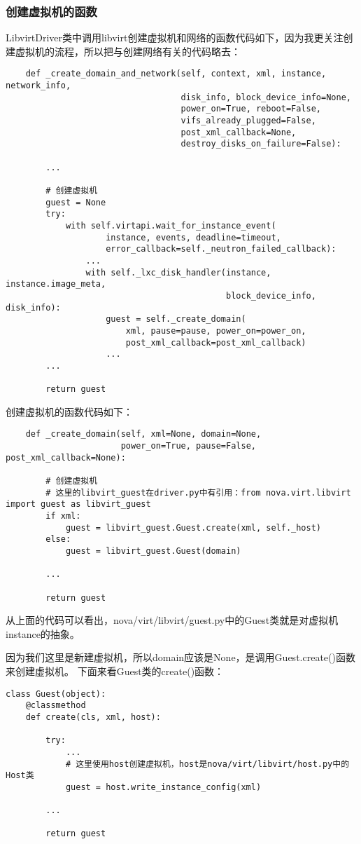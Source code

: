 \documentclass[a4paper,left=1.5cm,right=1.5cm,11pt]{article}
\begin{document}
\subsubsection{创建虚拟机的函数}
	LibvirtDriver类中调用libvirt创建虚拟机和网络的函数代码如下，因为我更关注创建虚拟机的流程，所以把与创建网络有关的代码略去：
	\begin{lstlisting}
	def _create_domain_and_network(self, context, xml, instance, network_info,
                                   disk_info, block_device_info=None,
                                   power_on=True, reboot=False,
                                   vifs_already_plugged=False,
                                   post_xml_callback=None,
                                   destroy_disks_on_failure=False):

        ...

		# 创建虚拟机
        guest = None
        try:
            with self.virtapi.wait_for_instance_event(
                    instance, events, deadline=timeout,
                    error_callback=self._neutron_failed_callback):
                ...
                with self._lxc_disk_handler(instance, instance.image_meta,
                                            block_device_info, disk_info):
                    guest = self._create_domain(
                        xml, pause=pause, power_on=power_on,
                        post_xml_callback=post_xml_callback)
					...
        ...

        return guest
	\end{lstlisting}

	创建虚拟机的函数代码如下：
	\begin{lstlisting}
	def _create_domain(self, xml=None, domain=None,
                       power_on=True, pause=False, post_xml_callback=None):
		
		# 创建虚拟机
		# 这里的libvirt_guest在driver.py中有引用：from nova.virt.libvirt import guest as libvirt_guest
        if xml:
            guest = libvirt_guest.Guest.create(xml, self._host)
        else:
            guest = libvirt_guest.Guest(domain)

        ...

        return guest
	\end{lstlisting}

	从上面的代码可以看出，nova/virt/libvirt/guest.py中的Guest类就是对虚拟机instance的抽象。\par

	因为我们这里是新建虚拟机，所以domain应该是None，是调用Guest.create()函数来创建虚拟机。
	下面来看Guest类的create()函数：
	\begin{lstlisting}
class Guest(object):
	@classmethod
    def create(cls, xml, host):
        
        try:
            ...
			# 这里使用host创建虚拟机，host是nova/virt/libvirt/host.py中的Host类
            guest = host.write_instance_config(xml)
        
		...

        return guest
	\end{lstlisting}
\end{document}
